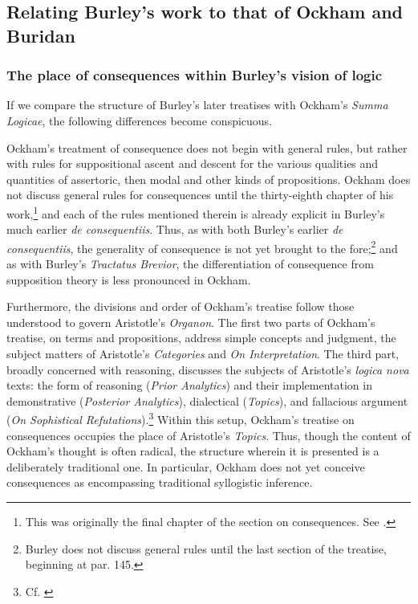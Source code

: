 \documentclass[]{article}
\begin{document}


\subsection{Relating Burley's work to that of Ockham and Buridan}
\subsubsection{The place of consequences within Burley's vision of logic}
If we compare the structure of Burley's later treatises with Ockham's \textit{Summa Logicae}, the following differences become conspicuous. 

Ockham's treatment of consequence does not begin with general rules, but rather with rules for suppositional ascent and descent for the various qualities and quantities of assertoric, then modal and other kinds of propositions. Ockham does not discuss general rules for consequences until the thirty-eighth chapter of his work,\footnote{This was originally the final chapter of the section on consequences. See \cite[pp. 41*-43*]{OckhamSL}.} and each of the rules mentioned therein is already explicit in Burley's much earlier \textit{de consequentiis}. Thus, as with both Burley's earlier \textit{de consequentiis}, the generality of consequence is not yet brought to the fore;\footnote{Burley does not discuss general rules until the last section of the treatise, beginning at par. 145.} and as with Burley's \textit{Tractatus Brevior}, the differentiation of consequence from supposition theory is less pronounced in Ockham.

Furthermore, the divisions and order of Ockham's treatise follow those understood to govern Aristotle's \textit{Organon}. The first two parts of Ockham's treatise, on terms and propositions, address simple concepts and judgment, the subject matters of Aristotle's \textit{Categories} and \textit{On Interpretation}. The third part, broadly concerned with reasoning, discusses the subjects of Aristotle's \textit{logica nova} texts: the form of reasoning (\textit{Prior Analytics}) and their implementation in demonstrative (\textit{Posterior Analytics}), dialectical (\textit{Topics}), and fallacious argument (\textit{On Sophistical Refutations}).\footnote{Cf. \cite[prol.]{AquinasPA}} Within this setup, Ockham's treatise on consequences occupies the place of Aristotle's \textit{Topics}. Thus, though the content of Ockham's thought is often radical, the structure wherein it is presented is a deliberately traditional one. In particular, Ockham does not yet conceive consequences as encompassing traditional syllogistic inference.
\end{document}
